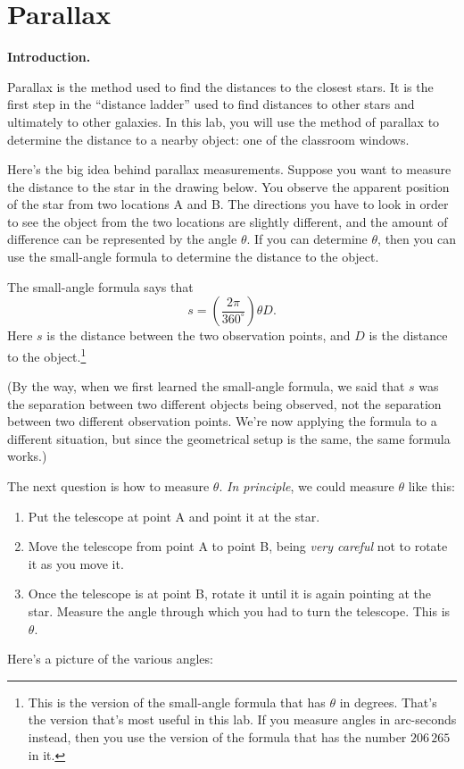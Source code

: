 \section{Parallax}

\makelabheader

{\bf Introduction.}

Parallax is the method used to find the distances to the closest
stars.  It is the first step in the ``distance ladder'' used to find
distances to other stars and ultimately to other galaxies.  In this
lab, you will use the method of parallax to determine the distance to a
nearby object: one of the classroom windows.

Here's the big idea behind parallax measurements.  Suppose you want
to measure the distance to the star in the drawing below.
You observe
the apparent position of the star from two locations A and B.  The directions
you have to look in order to see the object from the two locations
are slightly different, and the amount of difference can be represented
by the angle $\theta$.  If you can determine $\theta$, then you can
use the small-angle formula to determine the distance to the object.

The small-angle formula says that
$$
s = \left(\frac{2\pi}{360^\circ}\right)\theta D.
$$
Here $s$ is the distance between the two observation points, and 
$D$ is the distance to the object.\footnote{This is the version 
of the small-angle formula that has $\theta$ in degrees.  That's
the version that's most useful in this lab.  If you measure angles
in arc-seconds instead, then you use the version of the
formula that has the number $206\,265$ in it.}

(By the way, when we first learned the small-angle formula, we said
that $s$ was the separation between two different objects being
observed, not the separation between two different observation points.
We're now applying the formula to a different situation, but since the
geometrical setup is the same, the same formula works.)

The next question is how to measure $\theta$.  {\it In principle}, we could
measure $\theta$ like this:
\begin{enumerate}
\item Put the telescope at point A and point it at the star.
\item Move the telescope from point A to point B, being {\it very careful}
not to rotate it as you move it.
\item Once the telescope is at point B, rotate it until it is again pointing
at the star.  Measure the angle through which you had to turn the
telescope.  This is $\theta$.
\end{enumerate}
Here's a picture of the various angles:

